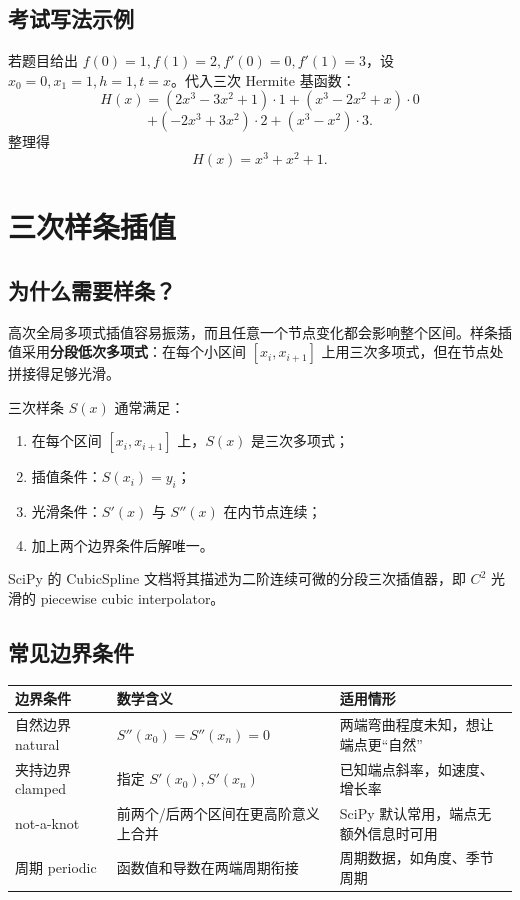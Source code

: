 \documentclass[11pt,a4paper]{ctexart}
\begin{document}
\subsection{考试写法示例}

若题目给出 $f(0)=1,f(1)=2,f'(0)=0,f'(1)=3$，设 $x_0=0,x_1=1,h=1,t=x$。代入三次 Hermite 基函数：
\[
H(x)=(2x^3-3x^2+1)\cdot 1+(x^3-2x^2+x)\cdot 0
\]
\[
+(-2x^3+3x^2)\cdot 2+(x^3-x^2)\cdot 3.
\]
整理得
\[
H(x)=x^3+x^2+1.
\]

\newpage
\section{三次样条插值}

\subsection{为什么需要样条？}

高次全局多项式插值容易振荡，而且任意一个节点变化都会影响整个区间。样条插值采用\textbf{分段低次多项式}：在每个小区间 $[x_i,x_{i+1}]$ 上用三次多项式，但在节点处拼接得足够光滑。

三次样条 $S(x)$ 通常满足：
\begin{enumerate}[label=\arabic*)]
  \item 在每个区间 $[x_i,x_{i+1}]$ 上，$S(x)$ 是三次多项式；
  \item 插值条件：$S(x_i)=y_i$；
  \item 光滑条件：$S'(x)$ 与 $S''(x)$ 在内节点连续；
  \item 加上两个边界条件后解唯一。
\end{enumerate}

SciPy 的 CubicSpline 文档将其描述为二阶连续可微的分段三次插值器，即 $C^2$ 光滑的 piecewise cubic interpolator。

\subsection{常见边界条件}

\begin{longtable}{p{3.0cm}p{6.2cm}p{5.2cm}}
\toprule
边界条件 & 数学含义 & 适用情形 \\
\midrule
自然边界 natural & $S''(x_0)=S''(x_n)=0$ & 两端弯曲程度未知，想让端点更“自然” \\
夹持边界 clamped & 指定 $S'(x_0),S'(x_n)$ & 已知端点斜率，如速度、增长率 \\
not-a-knot & 前两个/后两个区间在更高阶意义上合并 & SciPy 默认常用，端点无额外信息时可用 \\
周期 periodic & 函数值和导数在两端周期衔接 & 周期数据，如角度、季节周期 \\
\bottomrule
\end{longtable}
\end{document}
